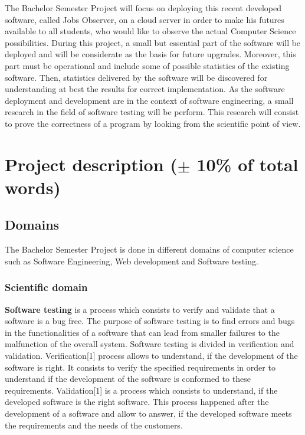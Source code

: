 \documentclass[conference,compsoc]{IEEEtran}
\begin{document}
The Bachelor Semester Project will focus on deploying this recent developed software, called Jobs Observer, on a cloud server in order to make his futures available to all students, who would like to observe the actual Computer Science possibilities.                                                                                                                                   
During this project, a small but essential part of the software will be deployed and will be considerate as the basis for future upgrades. Moreover, this part must be operational and include some of possible statistics of the existing software. Then, statistics delivered by the software will be discovered for understanding at best the results for correct implementation.                                                        
As the software deployment and development are in the context of software engineering, a small research in the field of software testing will be perform. This research will consist to prove the correctness of a program by looking from the scientific point of view. 

\section{Project description ($\pm$ 10\% of total words) }
\subsection{Domains}
The Bachelor Semester Project is done in different domains of computer science such as Software Engineering, Web development and Software testing. 

\subsubsection{Scientific domain}

\textbf{Software testing} is a process which consists to verify and validate that a software is a bug free. The purpose of software testing is to find errors and bugs in the functionalities of a software that can lead from smaller failures to the malfunction of the overall system. Software testing is divided in verification and validation.                                                                                                                             Verification[1] process allows to understand, if the development of the software is right. It consists to verify the specified requirements in order to understand if the development of the software is conformed to these requirements.                                                                                                                           Validation[1] is a process which consists to understand, if the developed software is the right software. This process happened after the development of a software and allow to answer, if the developed software meets the requirements and the needs of the customers. 
                                              
\end{document}
